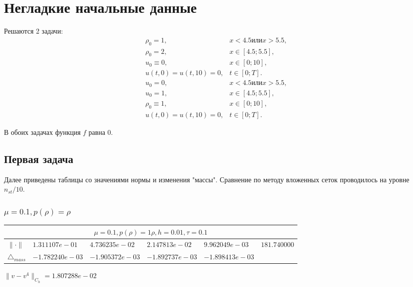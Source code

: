 \section{Негладкие начальные данные}

Решаются 2 задачи:
\begin{equation} \label{p1_1}
    \begin{array}{ll}
        \rho_0 = 1, & x < 4.5 \text{или} x > 5.5, \\
        \rho_0 = 2, & x \in [4.5; 5.5], \\
        u_0 \equiv 0, & x \in [0;10],\\
        u(t,0) = u(t, 10) = 0, & t \in [0; T].
    \end{array}
\end{equation}
\begin{equation} \label{p1_2}
    \begin{array}{ll}
        u_0 = 0, & x < 4.5 \text{или} x > 5.5, \\
        u_0 = 1, & x \in [4.5; 5.5], \\
        \rho_0 \equiv 1, & x \in [0;10],\\
        u(t,0) = u(t, 10) = 0, & t \in [0; T].
    \end{array}
\end{equation}

В обоих задачах функция $f$ равна 0.
\subsection{Первая задача}
Далее приведены таблицы со значениями нормы и изменения "массы". Сравнение по методу вложенных сеток проводилось на уровне $n_{st}/10$.
\subsubsection{$\mu = 0.1, p(\rho) = \rho $}
\begin{tabular}{*{6}{|l}|}
    \hline
     \\
    \hline
$\|\cdot \|$& $1.311107e-01$ & $4.736235e-02$ & $2.147813e-02$ & $9.962049e-03$ &$181.740000$\\
\hline
$\triangle_{mass}$& $-1.782240e-03$ & $-1.905372e-03$ & $-1.892737e-03$ & $-1.898413e-03$ &\\
\hline

\end{tabular}

$\|v-v^{4}\|_{C_h} = 1.807288e-02$

